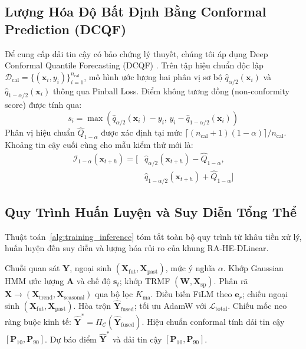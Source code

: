 \documentclass[10pt,journal,compsoc]{IEEEtran}
\begin{document}
\subsection{Lượng Hóa Độ Bất Định Bằng Conformal Prediction (DCQF)}
Để cung cấp dải tin cậy có bảo chứng lý thuyết, chúng tôi áp dụng Deep Conformal Quantile Forecasting (DCQF) \cite{angelopoulos2021conformal}. Trên tập hiệu chuẩn độc lập $\mathcal{D}_{\text{cal}} = \{(\mathbf{x}_i, y_i)\}_{i=1}^{n_{\text{cal}}}$, mô hình ước lượng hai phân vị sơ bộ $\hat{q}_{\alpha/2}(\mathbf{x}_i)$ và $\hat{q}_{1-\alpha/2}(\mathbf{x}_i)$ thông qua Pinball Loss. Điểm không tương đồng (non-conformity score) được tính qua:
\begin{equation}
s_i = \max\left(\hat{q}_{\alpha/2}(\mathbf{x}_i) - y_i, \, y_i - \hat{q}_{1-\alpha/2}(\mathbf{x}_i)\right)
\end{equation}
Phân vị hiệu chuẩn $\hat{Q}_{1-\alpha}$ được xác định tại mức $\lceil (n_{\text{cal}} + 1)(1 - \alpha) \rceil / n_{\text{cal}}$. Khoảng tin cậy cuối cùng cho mẫu kiểm thử mới là:
\begin{equation}
\begin{aligned}
\mathcal{I}_{1-\alpha}(\mathbf{x}_{t+h}) = \big[ & \hat{q}_{\alpha/2}(\mathbf{x}_{t+h}) - \hat{Q}_{1-\alpha}, \\
& \hat{q}_{1-\alpha/2}(\mathbf{x}_{t+h}) + \hat{Q}_{1-\alpha}\big]
\end{aligned}
\end{equation}
\subsection{Quy Trình Huấn Luyện và Suy Diễn Tổng Thể}
Thuật toán~\ref{alg:training_inference} tóm tắt toàn bộ quy trình từ khâu tiền xử lý, huấn luyện đến suy diễn và lượng hóa rủi ro của khung RA-HE-DLinear.
\begin{algorithm}[H]
\caption{Quy trình huấn luyện và suy diễn RA-HE-DLinear}
\label{alg:training_inference}
\small
\begin{algorithmic}[1]
\REQUIRE Chuỗi quan sát $\mathbf{Y}$, ngoại sinh $(\mathbf{X}_{\text{fut}}, \mathbf{X}_{\text{past}})$, mức ý nghĩa $\alpha$.
\STATE Khớp Gaussian HMM ước lượng $\mathbf{A}$ và chế độ $\mathbf{s}_t$; khớp TRMF $(\mathbf{W}, \mathbf{X}_{\text{sp}})$.
    \STATE Phân rã $\mathbf{X} \to (\mathbf{X}_{\text{trend}}, \mathbf{X}_{\text{seasonal}})$ qua bộ lọc $K_{\text{ma}}$.
    \STATE Điều biến FiLM theo $\mathbf{e}_r$; chiếu ngoại sinh $(\mathbf{X}_{\text{fut}}, \mathbf{X}_{\text{past}})$.
    \STATE Hòa trộn $\hat{\mathbf{Y}}_{\text{fused}}$; tối ưu AdamW với $\mathcal{L}_{\text{total}}$.
\ENDFOR
\STATE Chiếu mốc neo ràng buộc kinh tế: $\hat{\mathbf{Y}}^* = \Pi_{\mathcal{C}}(\hat{\mathbf{Y}}_{\text{fused}})$.
\STATE Hiệu chuẩn conformal tính dải tin cậy $[\mathbf{P}_{10}, \mathbf{P}_{90}]$.
\RETURN Dự báo điểm $\hat{\mathbf{Y}}^*$ và dải tin cậy $[\mathbf{P}_{10}, \mathbf{P}_{90}]$.
\end{algorithmic}
\end{algorithm}
\end{document}
